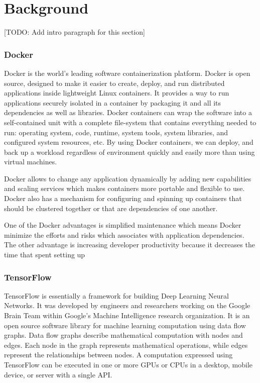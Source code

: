 \documentclass[conference]{IEEEtran}
\begin{document}
\section{Background}
[TODO: Add intro paragraph for this section]\\

\subsubsection{Docker}
Docker is the world's leading software containerization platform. Docker is open source, designed to make it easier to create, deploy, and run distributed applications inside lightweight Linux containers. It provides a way to run applications securely isolated in a container by packaging it and all its dependencies as well as libraries. Docker containers can wrap the software into a self-contained unit with a complete file-system that contains everything needed to run: operating system, code, runtime, system tools, system libraries, and configured system resources, etc. By using Docker containers, we can deploy, and back up a workload regardless of environment quickly and easily more than using virtual machines.

Docker allows to change any application dynamically by adding new capabilities and scaling services which makes containers more portable and flexible to use. Docker also has a mechanism for configuring and spinning up containers that should be clustered together or that are dependencies of one another.

One of the Docker advantages is simplified maintenance which means Docker minimize the efforts and risks which associates with application dependencies. The other advantage is increasing developer productivity because it decreases the time that spent setting up 

\subsubsection{TensorFlow}
TensorFlow is essentially a framework for building Deep Learning Neural Networks. It was developed by engineers and researchers working on the Google Brain Team within Google's Machine Intelligence research organization. It is an open source software library for machine learning computation using data flow graphs. Data flow graphs describe mathematical computation with nodes and edges. Each node in the graph represents mathematical operations, while edges represent the relationships between nodes. A computation expressed using TensorFlow can be executed in one or more GPUs or CPUs in a desktop, mobile device, or server with a single API.
\end{document}
